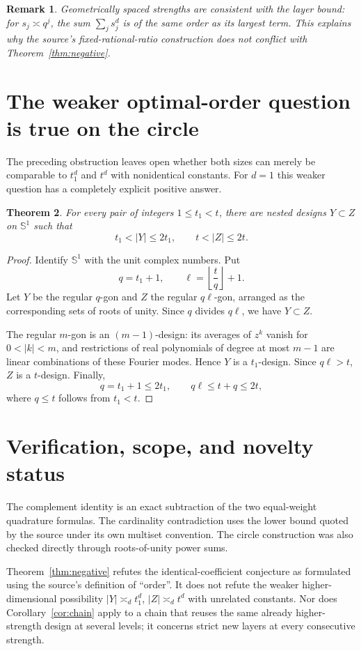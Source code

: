 \documentclass[11pt]{article}
\newtheorem{theorem}{Theorem}[section]
\newtheorem{remark}[theorem]{Remark}
\begin{document}
\begin{remark}
Geometrically spaced strengths are consistent with the layer bound: for
$s_j\asymp q^j$, the sum $\sum_j s_j^d$ is of the same order as its largest
term.  This explains why the source's fixed-rational-ratio construction does
not conflict with Theorem~\ref{thm:negative}.
\end{remark}

\section{The weaker optimal-order question is true on the circle}
The preceding obstruction leaves open whether both sizes can merely be
comparable to $t_1^d$ and $t^d$ with nonidentical constants.  For $d=1$ this
weaker question has a completely explicit positive answer.

\begin{theorem}\label{thm:circle}
For every pair of integers $1\leq t_1<t$, there are nested designs
$Y\subset Z$ on $\mathbb S^1$ such that
\[
 t_1<|Y|\leq2t_1,
 \qquad t<|Z|\leq2t.
\]
\end{theorem}
\begin{proof}
Identify $\mathbb S^1$ with the unit complex numbers.  Put
\[
 q=t_1+1,
 \qquad \ell=\left\lfloor\frac tq\right\rfloor+1.
\]
Let $Y$ be the regular $q$-gon and $Z$ the regular $q\ell$-gon, arranged as
the corresponding sets of roots of unity.  Since $q$ divides $q\ell$, we
have $Y\subset Z$.

The regular $m$-gon is an $(m-1)$-design: its averages of $z^k$ vanish for
$0<|k|<m$, and restrictions of real polynomials of degree at most $m-1$ are
linear combinations of these Fourier modes.  Hence $Y$ is a $t_1$-design.
Since $q\ell>t$, $Z$ is a $t$-design.  Finally,
\[
 q=t_1+1\leq2t_1,
 \qquad q\ell\leq t+q\leq2t,
\]
where $q\leq t$ follows from $t_1<t$.
\end{proof}

\begingroup
\small
\section{Verification, scope, and novelty status}
The complement identity is an exact subtraction of the two equal-weight
quadrature formulas.  The cardinality contradiction uses the lower bound
quoted by the source under its own multiset convention.  The circle
construction was also checked directly through roots-of-unity power sums.

Theorem~\ref{thm:negative} refutes the identical-coefficient conjecture as
formulated using the source's definition of ``order''.  It does not refute
the weaker higher-dimensional possibility
$|Y|\asymp_dt_1^d$, $|Z|\asymp_dt^d$ with unrelated constants.  Nor does
Corollary~\ref{cor:chain} apply to a chain that reuses the same already
higher-strength design at several levels; it concerns strict new layers at
every consecutive strength.
\end{document}
